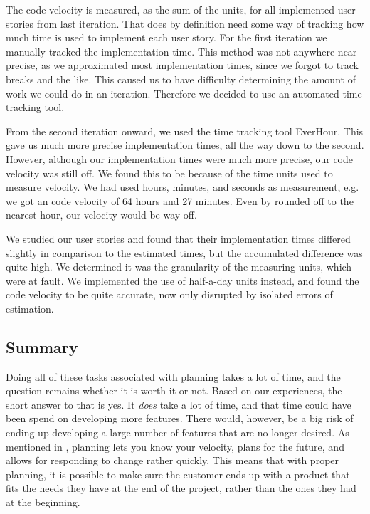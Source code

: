The code velocity is measured, as the sum of the units, for all implemented user stories from last iteration.
That does by definition need some way of tracking how much time is used to implement each user story.
For the first iteration we manually tracked the implementation time. This method was not anywhere near precise, as we approximated most implementation times, since we forgot to track breaks and the like. This caused us to have difficulty determining the amount of work we could do in an iteration. Therefore we decided to use an automated time tracking tool.

From the second iteration onward, we used the time tracking tool EverHour. 
This gave us much more precise implementation times, all the way down to the second.
However, although our implementation times were much more precise, our code velocity was still off.
We found this to be because of the time units used to measure velocity.
We had used hours, minutes, and seconds as measurement, e.g. we got an code velocity of 64 hours and 27 minutes.
Even by rounded off to the nearest hour, our velocity would be way off.

We studied our user stories and found that their implementation times differed slightly in comparison to the estimated times, but the accumulated difference was quite high.
We determined it was the granularity of the measuring units, which were at fault.
We implemented the use of half-a-day units instead, and found the code velocity to be quite accurate, now only disrupted by isolated errors of estimation.

\subsection{Summary}
Doing all of these tasks associated with planning takes a lot of time, and the question remains whether it is worth it or not.
Based on our experiences, the short answer to that is yes.
It \textit{does} take a lot of time, and that time could have been spend on developing more features.
There would, however, be a big risk of ending up developing a large number of features that are no longer desired.
As mentioned in , planning lets you know your velocity, plans for the future, and allows for responding to change rather quickly.
This means that with proper planning, it is possible to make sure the customer ends up with a product that fits the needs they have at the end of the project, rather than the ones they had at the beginning.

